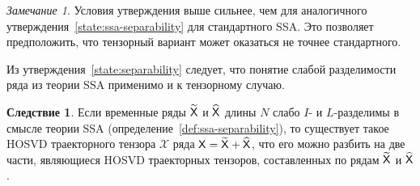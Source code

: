 \documentclass[specialist,
    substylefile = spbu.rtx,
    subf,href,colorlinks=true, 12pt]{disser}
\theoremstyle{plain}
\theoremstyle{definition}
\newtheorem*{corollary}{Следствие}
\theoremstyle{remark}
\newtheorem*{remark}{Замечание}
\begin{document}
    \begin{remark}
        Условия утверждения выше сильнее, чем для аналогичного утверждения~\ref{state:ssa-separability}
        для стандартного SSA.
        Это позволяет предположить, что тензорный вариант может оказаться не точнее стандартного.
    \end{remark}

    Из утверждения~\ref{state:separability} следует, что понятие слабой разделимости ряда из теории SSA
    применимо и к тензорному случаю.
    \begin{corollary}
        Если временные ряды $\widetilde{\mathsf{X}}$ и $\widehat{\mathsf{X}}$ длины $N$ слабо $I$- и $L$-разделимы
        в смысле теории SSA (определение~\ref{def:ssa-separability}),
        то существует такое HOSVD траекторного тензора $\mathcal{X}$ ряда
        $\mathsf{X}=\widetilde{\mathsf{X}} + \widehat{\mathsf{X}}$, что его можно разбить
        на две части, являющиеся HOSVD траекторных тензоров, составленных по рядам
        $\widetilde{\mathsf{X}}$ и $\widehat{\mathsf{X}}$.
    \end{corollary}
\end{document}
